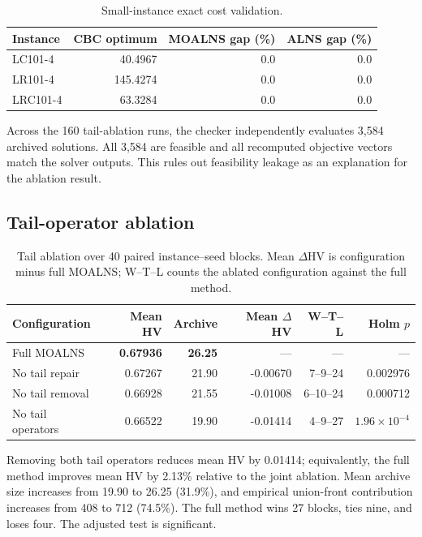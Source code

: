 \documentclass[11pt,a4paper]{article}
\newcommand{\MOALNS}{MOALNS}
\begin{document}
\begin{table}[tbp]
\centering
\caption{Small-instance exact cost validation.}
\label{tab:exact}
\begin{tabular}{lrrr}
\toprule
Instance & CBC optimum & MOALNS gap (\%) & ALNS gap (\%)\\
\midrule
LC101-4 & 40.4967 & 0.0 & 0.0\\
LR101-4 & 145.4274 & 0.0 & 0.0\\
LRC101-4 & 63.3284 & 0.0 & 0.0\\
\bottomrule
\end{tabular}
\end{table}

Across the 160 tail-ablation runs, the checker independently evaluates 3,584
archived solutions. All 3,584 are feasible and all recomputed objective vectors
match the solver outputs. This rules out feasibility leakage as an explanation
for the ablation result.

\subsection{Tail-operator ablation}

\begin{table}[tbp]
\centering
\caption{Tail ablation over 40 paired instance--seed blocks. Mean $\Delta$HV is
configuration minus full \MOALNS{}; W--T--L counts the ablated configuration
against the full method.}
\label{tab:tail-ablation}
\begin{tabular}{lrrrrr}
\toprule
Configuration & Mean HV & Archive & Mean $\Delta$HV & W--T--L & Holm $p$\\
\midrule
Full \MOALNS{} & \textbf{0.67936} & \textbf{26.25} & --- & --- & ---\\
No tail repair & 0.67267 & 21.90 & -0.00670 & 7--9--24 & 0.002976\\
No tail removal & 0.66928 & 21.55 & -0.01008 & 6--10--24 & 0.000712\\
No tail operators & 0.66522 & 19.90 & -0.01414 & 4--9--27 &
$1.96\times10^{-4}$\\
\bottomrule
\end{tabular}
\end{table}

Removing both tail operators reduces mean HV by 0.01414; equivalently, the full
method improves mean HV by 2.13\% relative to the joint ablation. Mean archive
size increases from 19.90 to 26.25 (31.9\%), and empirical union-front
contribution increases from 408 to 712 (74.5\%). The full method wins 27
blocks, ties nine, and loses four. The adjusted test is significant.
\end{document}
